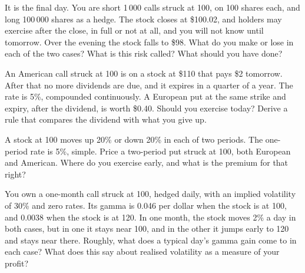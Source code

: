 \begin{question}\label{iq:iv2:options-parity-and-greeks:36}
It is the final day. You are short 1\,000 calls struck at 100, on 100 shares each, and long 100\,000 shares as a hedge. The stock closes at \$100.02, and holders may exercise after the close, in full or not at all, and you will not know until tomorrow. Over the evening the stock falls to \$98. What do you make or lose in each of the two cases? What is this risk called? What should you have done?
\end{question}

\begin{question}\label{iq:iv2:options-parity-and-greeks:37}
An American call struck at 100 is on a stock at \$110 that pays \$2 tomorrow. After that no more dividends are due, and it expires in a quarter of a year. The rate is 5\%, compounded continuously. A European put at the same strike and expiry, after the dividend, is worth \$0.40. Should you exercise today? Derive a rule that compares the dividend with what you give up.
\end{question}

\begin{question}\label{iq:iv2:options-parity-and-greeks:38}
A stock at 100 moves up 20\% or down 20\% in each of two periods. The one-period rate is 5\%, simple. Price a two-period put struck at 100, both European and American. Where do you exercise early, and what is the premium for that right?
\end{question}

\begin{question}\label{iq:iv2:options-parity-and-greeks:39}
You own a one-month call struck at 100, hedged daily, with an implied volatility of 30\% and zero rates. Its gamma is 0.046 per dollar when the stock is at 100, and 0.0038 when the stock is at 120. In one month, the stock moves 2\% a day in both cases, but in one it stays near 100, and in the other it jumps early to 120 and stays near there. Roughly, what does a typical day's gamma gain come to in each case? What does this say about realised volatility as a measure of your profit?
\end{question}

